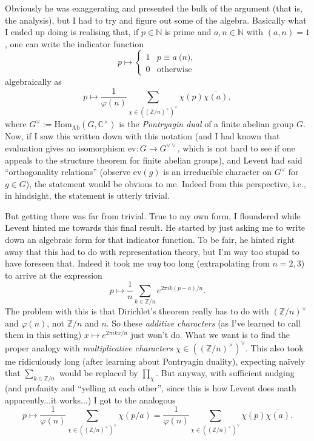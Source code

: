 Obviously he was exaggerating and presented the bulk of the argument
(that is, the analysis), but I had to try and figure out some of the
algebra. Basically what I ended up doing is realising that, if $p \in
\mathbb{N}$ is prime and $a, n \in \mathbb{N}$ with $(a,n) = 1$, one
can write the indicator function
\[
p \mapsto 
\begin{cases}
1 & p \equiv a \pod{n}, \\
0 & \text{otherwise}
\end{cases}
\]
algebraically as
\[
p \mapsto \frac{1}{\varphi(n)} \sum_{\chi \in
  ((\mathbb{Z}/n)^\times)^\vee} \chi(p)\overline{\chi(a)},
\]
where $G^\vee := \mathrm{Hom}_{\mathrm{Ab}}(G, \mathbb{C}^\times)$ is
the \emph{Pontryagin dual} of a finite abelian group $G$. Now, if I
saw this written down with this notation (and I had known that
evaluation gives an isomorphism $\mathrm{ev} : G \to G^{\vee\vee}$,
which is not hard to see if one appeals to the structure theorem for
finite abelian groups), and Levent had said ``orthogonality
relations'' (observe $\mathrm{ev}(g)$ is an irreducible character on
$G^\vee$ for $g \in G$), the statement would be obvious to me. Indeed
from this perspective, i.e., in hindsight, the statement is utterly
trivial.

But getting there was far from trivial. True to my own form, I
floundered while Levent hinted me towards this final result. He
started by just asking me to write down an algebraic form for that
indicator function. To be fair, he hinted right away that this had to
do with representation theory, but I'm way too stupid to have foreseen
that. Indeed it took me \emph{way} too long (extrapolating from
$n=2,3$) to arrive at the expression
\[
p \mapsto \frac{1}{n} \sum_{k \in \mathbb{Z}/n} e^{2\pi ik(p-a)/n}.
\]
The problem with this is that Dirichlet's theorem really has to do
with $(\mathbb{Z}/n)^\times$ and $\varphi(n)$, not $\mathbb{Z}/n$ and
$n$. So these \emph{additive characters} (as I've learned to call them
in this setting) $x \mapsto e^{2\pi ikx/n}$ just won't do. What we
want is to find the proper analogy with \emph{multiplicative
  characters} $\chi \in ((\mathbb{Z}/n)^\times)^\vee$. This also took
me ridiculously long (after learning about Pontryagin duality),
expecting na\"ively that $\sum_{k \in \mathbb{Z}/n}$ would be replaced
by $\prod_\chi$. But anyway, with sufficient nudging (and profanity
and ``yelling at each other'', since this is how Levent does math
apparently...it works...) I got to the analogous
\[
p \mapsto \frac{1}{\varphi(n)} \sum_{\chi \in
  ((\mathbb{Z}/n)^\times)^\vee} \chi(p/a) = \frac{1}{\varphi(n)}
\sum_{\chi \in ((\mathbb{Z}/n)^\times)^\vee} \chi(p)\overline{\chi(a)}.
\]

